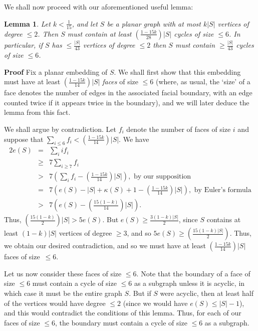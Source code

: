 \documentclass{article}
\newtheorem{Lemma}[Theorem]{Lemma}
\newtheorem{Proof of Theorem}{Proof of Theorem}
\begin{document}
\begin{displaymath}
\end{displaymath}

We shall now proceed with our aforementioned useful lemma:






\begin{Lemma} \label{bounded1}
Let $k < \frac{1}{15}$,
and let $S$ be a planar graph with at most $k|S|$ vertices of degree $\leq 2$.
Then $S$ must contain at least $\left( \frac{1-15k}{28} \right) |S|$ cycles of size $\leq 6$.
In particular, if $S$ has $\leq \frac{|S|}{43}$ vertices of degree $\leq 2$
then $S$ must contain $\geq \frac{|S|}{43}$ cycles of size $\leq 6$.
\end{Lemma}
\textbf{Proof}
Fix a planar embedding of $S$.
We shall first show that this embedding must have at least 
$\left( \frac{1-15k}{14} \right) |S|$ \textit{faces} of size $\leq 6$
(where, as usual, the `size' of a face denotes the number of edges in the associated facial boundary,
with an edge counted twice if it appears twice in the boundary),
and we will later deduce the lemma from this fact.

We shall argue by contradiction.
Let $f_{i}$ denote the number of faces of size $i$ and 
suppose that $\sum_{i \leq 6} f_{i} < \left( \frac{1-15k}{14} \right) |S|$.
We have
\begin{eqnarray*}
2e(S) & = & \sum_{i} i f_{i} \\
& \geq & 7 \sum_{i \geq 7} f_{i} \\
& > & 7 \left( \sum_{i} f_{i} - \left( \frac{1-15k}{14} \right) |S| \right), 
\textrm{ by our supposition} \\
& = & 7 \left( e(S) - |S| + \kappa(S) + 1- \left( \frac{1-15k}{14} \right) |S| \right),
\textrm{ by Euler's formula} \\
& > & 7 \left( e(S) - \left( \frac{15(1-k)}{14} \right) |S| \right). 
\end{eqnarray*}
Thus,
$\left( \frac{15(1-k)}{2} \right) |S| > 5e(S)$.
But $e(S) \geq \frac{3(1-k)|S|}{2}$,
since $S$ contains at least $(1-k)|S|$ vertices of degree $\geq 3$,
and so $5e(S) \geq \left( \frac{15(1-k)|S|}{2} \right)$.
Thus, we obtain our desired contradiction,
and so we must have at least $\left( \frac{1-15k}{14} \right) |S|$ faces of size~$\leq 6$.

Let us now consider these faces of size $\leq 6$.
Note that the boundary of a face of size $\leq 6$ must contain a cycle of size $\leq 6$
as a subgraph unless it is acyclic,
in which case it must be the entire graph $S$.
But if $S$ were acyclic,
then at least half of the vertices would have degree $\leq 2$
(since we would have $e(S) \leq |S|-1$),
and this would contradict the conditions of this lemma.
Thus, for each of our faces of size $\leq 6$,
the boundary must contain a cycle of size $\leq 6$ as a subgraph.
\end{document}
